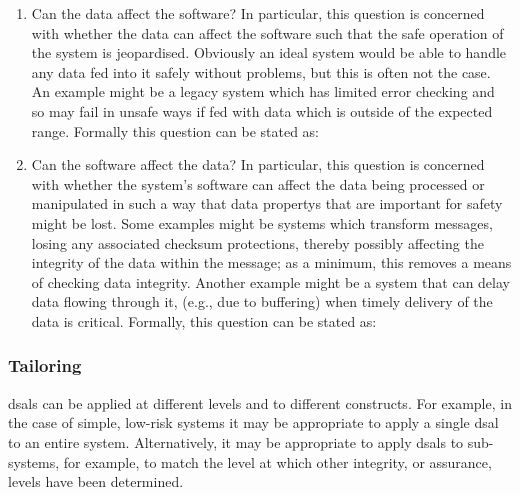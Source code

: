 \begin{enumerate}
  \item Can the data affect the software? In particular, this question is concerned with whether the data can affect the software such that the safe operation of the system is jeopardised. Obviously an ideal system would be able to handle any data fed into it safely without problems, but this is often not the case. An example might be a legacy system which has limited error checking and so may fail in unsafe ways if fed with data which is outside of the expected range. Formally this question can be stated as: 
  \item Can the software affect the data? In particular, this question is concerned with whether the system's software can affect the data being processed or manipulated in such a way that \glspl{data property} that are important for safety might be lost. Some examples might be systems which transform messages, losing any associated checksum protections, thereby possibly affecting the \gls{integrity} of the data within the message; as a minimum, this removes a means of checking data \gls{integrity}. Another example might be a system that can delay data flowing through it, (e.g., due to buffering) when timely delivery of the data is critical. Formally, this question can be stated as: 
\end{enumerate}

\subsubsection{Tailoring}\label{bkm:activities:analyse:tailoring}
\glspl{dsal} can be applied at different levels and to different constructs. For example, in the case of simple, low-risk systems it may be appropriate to apply a single \gls{dsal} to an entire system. Alternatively, it may be appropriate to apply \glspl{dsal} to sub-systems, for example, to match the level at which other \gls{integrity}, or assurance, levels have been determined. 

